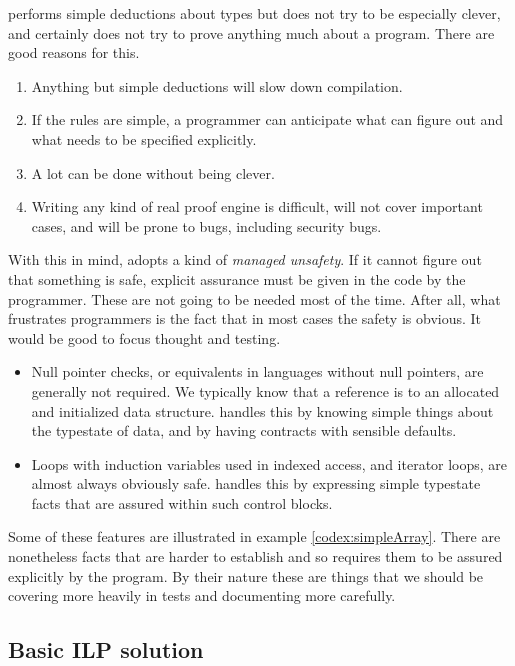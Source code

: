 \documentclass[10pt]{amsart}
\begin{document}
\Utop performs simple deductions about types but does not try to be
especially clever, and certainly does not try to prove anything much
about a program.  There are good reasons for this.
\begin{enumerate}
\item Anything but simple deductions will slow down compilation.
\item If the rules are simple, a programmer can anticipate what \Utop
  can figure out and what needs to be specified explicitly.
\item A lot can be done without being clever.
\item Writing any kind of real proof engine is difficult, will not
  cover important cases, and will be prone to bugs, including security
  bugs.
\end{enumerate}
With this in mind, \Utop adopts a kind of \emph{managed unsafety}.  If
it cannot figure out that something is safe, explicit assurance must
be given in the code by the programmer.  These are not going to be
needed most of the time.  After all, what frustrates programmers is
the fact that in most cases the safety is obvious.  It would be good
to focus thought and testing.
\begin{itemize}
\item Null pointer checks, or equivalents in languages without null
  pointers, are generally not required.  We typically know that a
  reference is to an allocated and initialized data structure.  \Utop
  handles this by knowing simple things about the typestate of data,
  and by having contracts with sensible defaults.
\item Loops with induction variables used in indexed access, and
  iterator loops, are almost always obviously safe.  \Utop handles
  this by expressing simple typestate facts that are assured within
  such control blocks.
\end{itemize}
Some of these features are illustrated in example
\ref{codex:simpleArray}.  There are nonetheless facts that are harder
to establish and so \Utop requires them to be assured explicitly by
the program.  By their nature these are things that we should be
covering more heavily in tests and documenting more carefully.

\subsection{Basic ILP solution}
\end{document}
